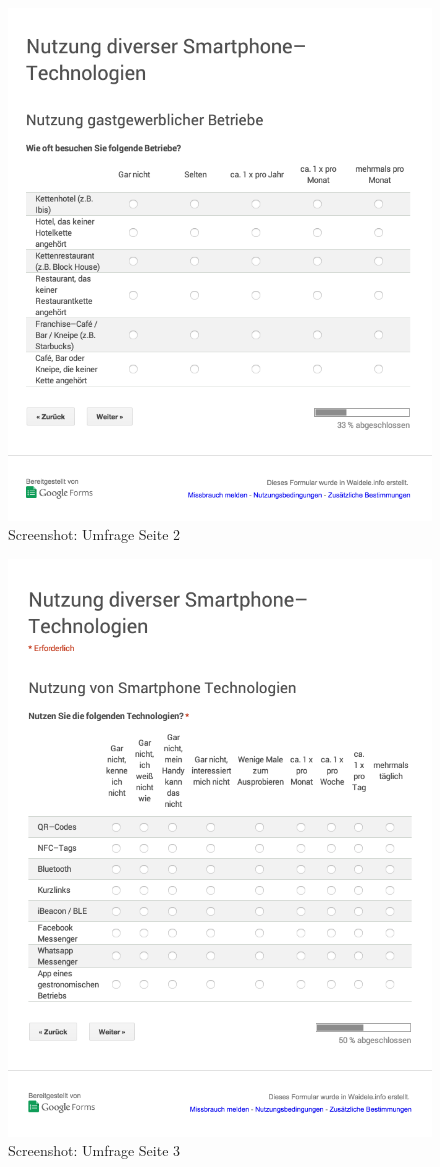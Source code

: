 \begin{figure}[H]
\begin{center}
\includegraphics[width=.5\textwidth]{Umfrage-S2.png}
\caption{Screenshot: Umfrage Seite 2}
\label{pic:us2}
\end{center}
\end{figure}

\begin{figure}[H]
\begin{center}
\includegraphics[width=.5\textwidth]{Umfrage-S3.png}
\caption{Screenshot: Umfrage Seite 3}
\label{pic:us3}
\end{center}
\end{figure}

